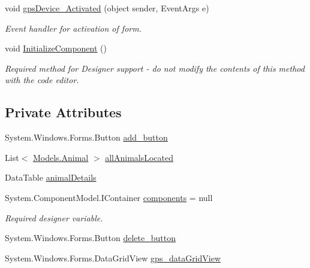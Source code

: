 \begin{DoxyCompactItemize}
\item 
void \hyperlink{classWildlifeTrackingApp_1_1GPSDevice_a6ea679908b776bed849fbdc9eb2e3e48}{gps\+Device\+\_\+\+Activated} (object sender, Event\+Args e)
\begin{DoxyCompactList}\small\item\em Event handler for activation of form. \end{DoxyCompactList}\item 
void \hyperlink{classWildlifeTrackingApp_1_1GPSDevice_a6405d5db675d5338663195a4d12b4c9f}{Initialize\+Component} ()
\begin{DoxyCompactList}\small\item\em Required method for Designer support -\/ do not modify the contents of this method with the code editor. \end{DoxyCompactList}\end{DoxyCompactItemize}
\subsection*{Private Attributes}
\begin{DoxyCompactItemize}
\item 
System.\+Windows.\+Forms.\+Button \hyperlink{classWildlifeTrackingApp_1_1GPSDevice_a7f1dbd5813451728f923cb88a3469cb6}{add\+\_\+button}
\item 
List$<$ \hyperlink{classWildlifeTrackingApp_1_1Models_1_1Animal}{Models.\+Animal} $>$ \hyperlink{classWildlifeTrackingApp_1_1GPSDevice_af6ea227040809ec847f3ab49aef0187c}{all\+Animals\+Located}
\item 
Data\+Table \hyperlink{classWildlifeTrackingApp_1_1GPSDevice_adb239b554c7bf520291b6165244efd42}{animal\+Details}
\item 
System.\+Component\+Model.\+I\+Container \hyperlink{classWildlifeTrackingApp_1_1GPSDevice_a02595f1c09713bb71dcb2fbbfc7ffa4b}{components} = null
\begin{DoxyCompactList}\small\item\em Required designer variable. \end{DoxyCompactList}\item 
System.\+Windows.\+Forms.\+Button \hyperlink{classWildlifeTrackingApp_1_1GPSDevice_a84dcb7863c4f709001a644ff98f22414}{delete\+\_\+button}
\item 
System.\+Windows.\+Forms.\+Data\+Grid\+View \hyperlink{classWildlifeTrackingApp_1_1GPSDevice_a39b3e0567cbf561947dccf8b8fcd9db1}{gps\+\_\+data\+Grid\+View}
\end{DoxyCompactItemize}
